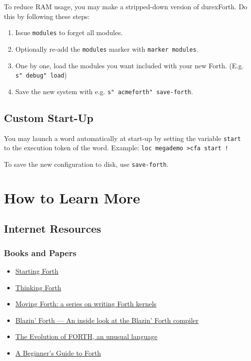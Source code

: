 To reduce RAM usage, you may make a stripped-down version of durexForth. Do this by following these steps:

\begin{enumerate}
\item Issue \texttt{modules} to forget all modules.
\item Optionally re-add the \texttt{modules} marker with \texttt{marker modules}.
\item One by one, load the modules you want included with your new Forth. (E.g. \texttt{s" debug" load})
\item Save the new system with e.g. \texttt{s" acmeforth" save-forth}.
\end{enumerate}

\subsection{Custom Start-Up}

You may launch a word automatically at start-up by setting the variable \texttt{start} to the execution token of the word.  Example: \texttt{loc megademo >cfa start !}

To save the new configuration to disk, use \texttt{save-forth}.

\section{How to Learn More}

\subsection{Internet Resources}

\subsubsection{Books and Papers}

\begin{itemize}
\item \href{http://www.forth.com/starting-forth/}{Starting Forth}
\item \href{http://thinking-forth.sourceforge.net/}{Thinking Forth}
\item \href{http://www.bradrodriguez.com/papers/}{Moving Forth: a series on writing Forth kernels}
\item \href{http://www.csbruce.com/~csbruce/cbm/transactor/v7/i5/p058.html}{Blazin' Forth --- An inside look at the Blazin' Forth compiler}
\item \href{http://dobbscodetalk.com/index.php?option=com_myblog&show=In-this-1980-article-from-Byte-Charles-Moore-recounts-the-creation-of-Forth..html&Itemid=29}{The Evolution of FORTH, an unusual language}
\item \href{http://galileo.phys.virginia.edu/classes/551.jvn.fall01/primer.htm}{A Beginner's Guide to Forth}
\end{itemize}

